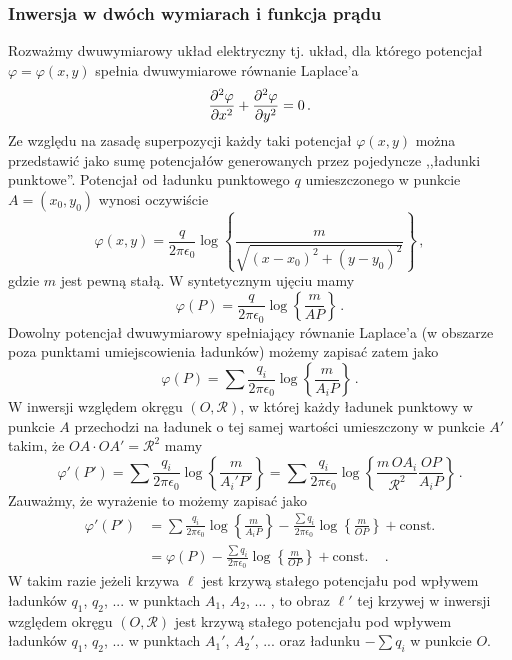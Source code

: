 \documentclass[../main.tex]{subfiles}
\begin{document}
\subsubsection{Inwersja w dwóch wymiarach i funkcja prądu}
Rozważmy dwuwymiarowy układ elektryczny tj. układ, dla którego potencjał \(\varphi=\varphi(x,y)\) spełnia dwuwymiarowe równanie Laplace'a
\begin{equation*}
    \pdv[2]{\varphi}{x}+\pdv[2]{\varphi}{y}=0\,.
\end{equation*}
Ze względu na zasadę superpozycji każdy taki potencjał \(\varphi(x,y)\) można przedstawić jako sumę potencjałów generowanych przez pojedyncze ,,ładunki punktowe''. Potencjał od ładunku punktowego \(q\) umieszczonego w punkcie \(A=(x_0,y_0)\) wynosi oczywiście
\begin{equation*}
    \varphi(x,y)=\frac{q}{2\pi\epsilon_0}\log\left\{\frac{m}{\sqrt{(x-x_0)^2+(y-y_0)^2}}\right\}\,,
\end{equation*}
gdzie \(m\) jest pewną stałą. W syntetycznym ujęciu mamy
\begin{equation*}
    \varphi(P)=\frac{q}{2\pi\epsilon_0}\log\left\{\frac{m}{AP}\right\}\,.
\end{equation*}
Dowolny potencjał dwuwymiarowy spełniający równanie Laplace'a (w obszarze poza punktami umiejscowienia ładunków) możemy zapisać zatem jako
\begin{equation*}
    \varphi(P)=\sum\frac{q_i}{2\pi\epsilon_0}\log\left\{\frac{m}{A_iP}\right\}\,.
\end{equation*}
W inwersji względem okręgu \((O,\mathscr{R})\), w której każdy ładunek punktowy w punkcie \(A\) przechodzi na ładunek o tej samej wartości umieszczony w punkcie \(A'\) takim, że \(OA\cdot OA'=\mathscr{R}^2\)
mamy
\begin{equation*}
    \varphi'(P')=\sum\frac{q_i}{2\pi\epsilon_0}\log\left\{\frac{m}{A_i'P'}\right\}=\sum\frac{q_i}{2\pi\epsilon_0}\log\left\{\frac{m\,OA_i}{\mathscr{R}^2}\frac{OP}{A_iP}\right\}\,.
\end{equation*}
Zauważmy, że wyrażenie to możemy zapisać jako
\begin{equation*}
\begin{split}
        \varphi'(P')&=\sum\frac{q_i}{2\pi\epsilon_0}\log\left\{\frac{m}{A_iP}\right\}-\frac{\sum q_i}{2\pi\epsilon_0}\log\left\{\frac{m}{OP}\right\}+\text{const.}\\
        &=\varphi(P)-\frac{\sum q_i}{2\pi\epsilon_0}\log\left\{\frac{m}{OP}\right\}+\text{const.}\quad\,.
\end{split}
\end{equation*}
W takim razie jeżeli krzywa \(\ell\) jest krzywą stałego potencjału pod wpływem ładunków \(q_1\), \(q_2\), ... w punktach \(A_1\), \(A_2\), ... , to obraz \(\ell'\) tej krzywej w inwersji względem okręgu \((O,\mathscr{R})\) jest krzywą stałego potencjału pod wpływem ładunków \(q_1\), \(q_2\), ... w punktach \(A_1'\), \(A_2'\), ... oraz ładunku \(-\sum q_i\) w punkcie \(O\).
\medskip
\end{document}
